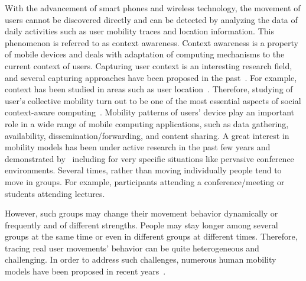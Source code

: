 With the advancement of smart phones and wireless technology, the movement of users cannot be discovered directly and can be detected by analyzing the data of daily activities such as user mobility traces and location information. This phenomenon is referred to as context awareness. Context awareness is a property of mobile devices and deals with adaptation of computing mechanisms to the current context of users. Capturing user context is an interesting research field, and several capturing approaches have been proposed in the past~\cite{IRoussaki2012}\cite{QWang2013}\cite{CAnagnostopoulos2011}. For example, context has been studied in areas such as user location~\cite{MdARahman2011}. Therefore, studying of user's collective mobility turn out to be one of the most essential aspects of social context-aware computing~\cite{WRichards2009}\cite{PMakris2013}. Mobility patterns of users' device play an important role in a wide range of mobile computing applications, such as data gathering, availability, dissemination/forwarding, and content sharing. A great interest in mobility models has been under active research in the past few years and demonstrated by~\cite{SKosta2014}\cite{RJLa2012}\cite{QDong2012}\cite{JBoudec2005}\cite{KFlorkey2011}\cite{DLe2006} including for very specific situations like pervasive conference environments. Several times, rather than moving individually people tend to move in groups. For example, participants attending a conference/meeting or students attending lectures.

However, such groups may change their movement behavior dynamically or frequently and of different strengths. People may stay longer among several groups at the same time or even in different groups at different times. Therefore, tracing real user movements' behavior can be quite heterogeneous and challenging. In order to address such challenges, numerous human mobility models have been proposed in recent years~\cite{VBorrel2009}\cite{MMusolesi2007}\cite{YXia2013}\cite{SFernandes2012}\cite{AMei2009}\cite{KLee2009}\cite{CZhao2010}.

